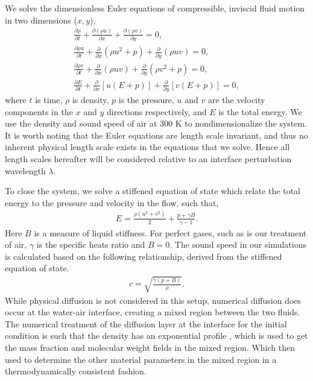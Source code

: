 We solve the dimensionless Euler equations of compressible, inviscid
fluid motion in two dimensions ($x,y$),
%
\begin{subequations} \label{eq:euler}%
  \begin{align}%
    \frac{\partial \rho}{\partial t} + \frac{\partial \left(\rho u\right)}{\partial x} + \frac{\partial \left(\rho v\right)}{\partial y} = 0,\\
    \frac{\partial \rho u}{\partial t} + \frac{\partial}{\partial x}\left( \rho u^2+p\right)  + \frac{\partial}{\partial y}\left( \rho uv\right) = 0,\\
    \frac{\partial \rho v}{\partial t} + \frac{\partial}{\partial x}\left( \rho uv\right)  + \frac{\partial}{\partial y}\left( \rho v^2+p\right) = 0,\\
    \frac{\partial E}{\partial t} + \frac{\partial}{\partial x}\left[u\left(E+p\right)\right] + \frac{\partial}{\partial y}\left[v\left(E+p\right)\right] = 0,
  \end{align}%
\end{subequations}%
%
where $t$ is time, $\rho$ is density, $p$ is the pressure, $u$ and $v$
are the velocity components in the $x$ and $y$ directions
respectively, and $E$ is the total energy. We use the density and
sound speed of air at 300 K to nondimensionalize the system. It is
worth noting that the Euler equations are length scale invariant, and
thus no inherent physical length scale exists in the equations that we
solve. Hence all length scales hereafter will be considered relative
to an interface perturbation wavelength $\lambda$.

To close the system, we solve a stiffened equation of state which
relate the total energy to the pressure and velocity in the flow, such
that,
% 
\begin{align} \label{eq:stiffened_eos}%
  E=\frac{\rho\left(u^2+v^2\right)}{2} + \frac{p+\gamma B}{\gamma-1}.
\end{align}
%
Here $B$ is a measure of liquid stiffness. For perfect gases, such as
is our treatment of air, $\gamma$ is the specific heats ratio and
$B=0$. The sound speed in our simulations is calculated based on the
following relationship, derived from the stiffened equation of state.
%
\begin{align}
  c = \sqrt{\frac{\gamma\left(p+B\right)}{\rho}}.
\end{align}
%
While physical diffusion is not considered in this setup, numerical
diffusion does occur at the water-air interface, creating a mixed
region between the two fluids. The numerical treatment of the
diffusion layer at the interface for the initial condition is such
that the density has an exponential profile \citep{Latini2007}, which
is used to get the mass fraction and molecular weight fields in the
mixed region. Which then used to determine the other material
parameters in the mixed region in a thermodynamically consistent
fashion.

